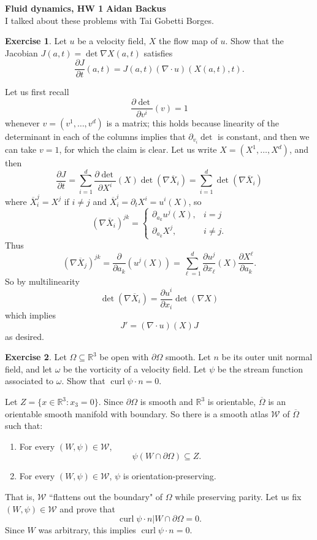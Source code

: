 \documentclass[10pt]{article}
\newcommand{\RR}{\mathbb{R}}
\DeclareMathOperator{\curl}{curl}
\theoremstyle{definition}
\newtheorem{exer}{Exercise}
\begin{document}
\noindent
\large\textbf{Fluid dynamics, HW 1} \hfill \textbf{Aidan Backus} \\

I talked about these problems with Tai Gobetti Borges.

\begin{exer}
Let $u$ be a velocity field, $X$ the flow map of $u$.
Show that the Jacobian $J(a, t) = \det \nabla X(a, t)$ satisfies
$$\frac{\partial J}{\partial t}(a, t) = J(a, t)(\nabla \cdot u)(X(a, t), t).$$
\end{exer}

Let us first recall
$$\frac{\partial \det}{\partial v^i}(v) = 1$$
whenever $v = (v^1, \dots, v^d)$ is a matrix; this holds because linearity of the determinant in each of the columns implies that $\partial_{v_i} \det$ is constant, and then we can take $v = 1$, for which the claim is clear.
Let us write $X = (X^1, \dots, X^d)$, and then
$$\frac{\partial J}{\partial t} = \sum_{i=1}^d \frac{\partial \det}{\partial X^i}(X) \det(\nabla \overline X_i) = \sum_{i=1}^d \det(\nabla \overline X_i)$$
where $\overline X_i^j = X^j$ if $i \neq j$ and $\overline X_i^i = \partial_t X^i = u^i(X)$, so
$$(\nabla \overline X_i)^{jk} = \begin{cases}
\partial_{a_k} u^j(X), &i = j\\
\partial_{a_k} X^j, &i \neq j.
\end{cases}$$
Thus
$$(\nabla \overline X_j)^{jk} = \frac{\partial}{\partial a_k}(u^j(X)) = \sum_{\ell=1}^d \frac{\partial u^j}{\partial x_\ell}(X) \frac{\partial X^\ell}{\partial a_k}.$$
So by multilinearity
$$\det(\nabla \overline X_i) = \frac{\partial u^i}{\partial x_i} \det(\nabla X)$$
which implies
$$J' = (\nabla \cdot u)(X) J$$
as desired.

\begin{exer}
Let $\Omega \subseteq \RR^3$ be open with $\partial \Omega$ smooth. Let $n$ be its outer unit normal field, and let $\omega$ be the vorticity of a velocity field.
Let $\psi$ be the stream function associated to $\omega$. Show that $\curl \psi \cdot n = 0$.
\end{exer}

Let $Z = \{x \in \RR^3: x_3 = 0\}$.
Since $\partial \Omega$ is smooth and $\RR^3$ is orientable, $\overline \Omega$ is an orientable smooth manifold with boundary.
So there is a smooth atlas $\mathcal W$ of $\overline \Omega$ such that:
\begin{enumerate}
\item For every $(W, \psi) \in \mathcal W$,
$$\psi(W \cap \partial \Omega) \subseteq Z.$$
\item For every $(W, \psi) \in \mathcal W$, $\psi$ is orientation-preserving.
\end{enumerate}
That is, $\mathcal W$ ``flattens out the boundary" of $\Omega$ while preserving parity.
Let us fix $(W, \psi) \in \mathcal W$ and prove that
$$\curl \psi\cdot n|W \cap \partial \Omega = 0.$$
Since $W$ was arbitrary, this implies $\curl \psi \cdot n = 0$.
\end{document}
